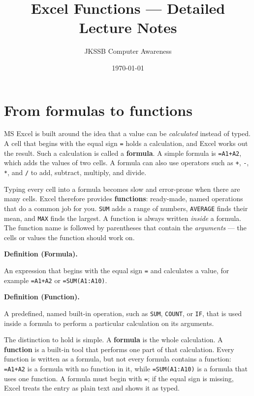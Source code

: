 \documentclass[11pt]{article}
\title{Excel Functions --- Detailed Lecture Notes}
\author{JKSSB Computer Awareness}
\date{\today}
\newenvironment{definitionbox}[1]{%
  \par\noindent\textbf{Definition (#1).}\ \itshape
}{\par\vspace{0.3em}}
\begin{document}
\maketitle

\section{From formulas to functions}
MS Excel is built around the idea that a value can be \emph{calculated}
instead of typed. A cell that begins with the equal sign \texttt{=} holds a
calculation, and Excel works out the result. Such a calculation is called a
\textbf{formula}. A simple formula is \texttt{=A1+A2}, which adds the values
of two cells. A formula can also use operators such as \texttt{+}, \texttt{-},
\texttt{*}, and \texttt{/} to add, subtract, multiply, and divide.

Typing every cell into a formula becomes slow and error-prone when there are
many cells. Excel therefore provides \textbf{functions}: ready-made, named
operations that do a common job for you. \texttt{SUM} adds a range of
numbers, \texttt{AVERAGE} finds their mean, and \texttt{MAX} finds the largest.
A function is always written \emph{inside} a formula. The function name is
followed by parentheses that contain the \emph{arguments} --- the cells or
values the function should work on.

\begin{definitionbox}{Formula}
An expression that begins with the equal sign \texttt{=} and calculates a
value, for example \texttt{=A1+A2} or \texttt{=SUM(A1:A10)}.
\end{definitionbox}

\begin{definitionbox}{Function}
A predefined, named built-in operation, such as \texttt{SUM}, \texttt{COUNT},
or \texttt{IF}, that is used inside a formula to perform a particular
calculation on its arguments.
\end{definitionbox}

The distinction to hold is simple. A \textbf{formula} is the whole
calculation. A \textbf{function} is a built-in tool that performs one part of
that calculation. Every function is written as a formula, but not every
formula contains a function: \texttt{=A1+A2} is a formula with no function in
it, while \texttt{=SUM(A1:A10)} is a formula that uses one function. A
formula must begin with \texttt{=}; if the equal sign is missing, Excel treats
the entry as plain text and shows it as typed.
\end{document}

